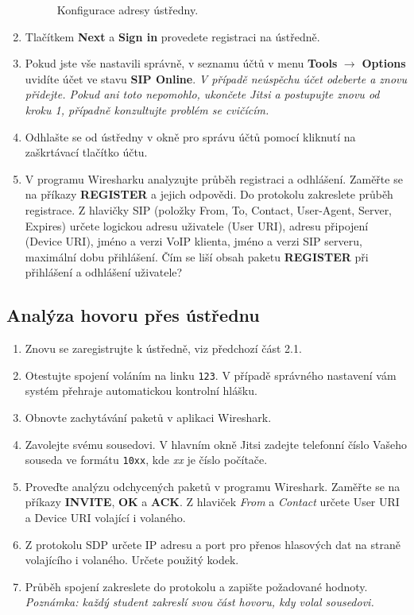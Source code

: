 \begin{enumerate}
\begin{figure}[h!]
        \caption{Konfigurace adresy ústředny.}
        \label{fig:registration2}
      \end{figure}
    \item Tlačítkem {\bf Next} a {\bf Sign in} provedete registraci na ústředně.
    \item  Pokud jste vše nastavili správně, v seznamu účtů v menu {\bf Tools} $\rightarrow$ {\bf Options} uvidíte účet ve stavu {\bf SIP Online}. {\it V případě neúspěchu účet odeberte a znovu přidejte. Pokud ani toto nepomohlo, ukončete Jitsi a postupujte znovu od kroku 1, případně konzultujte problém se cvičícím.}
    \item Odhlašte se od ústředny v okně pro správu účtů pomocí kliknutí na
      zaškrtávací tlačítko účtu.
    \item V programu Wiresharku analyzujte průběh registraci a odhlášení. Zaměřte se na příkazy {\bf REGISTER} a jejich odpovědi. Do protokolu zakreslete průběh registrace. Z hlavičky SIP (položky From, To, Contact, User-Agent, Server, Expires) určete logickou adresu uživatele (User URI), adresu připojení (Device URI), jméno a verzi VoIP klienta, jméno a verzi SIP serveru, maximální dobu přihlášení. Čím se liší obsah paketu {\bf REGISTER} při přihlášení a odhlášení uživatele?
\end{enumerate}

\subsection{Analýza hovoru přes ústřednu}
\begin{enumerate}
  \item Znovu se zaregistrujte k ústředně, viz předchozí část 2.1.
  \item Otestujte spojení voláním na linku {\tt 123}. V případě správného nastavení vám systém přehraje automatickou kontrolní hlášku. 
    \item Obnovte zachytávání paketů v aplikaci Wireshark.
    \item Zavolejte svému sousedovi. V hlavním okně Jitsi zadejte telefonní číslo Vašeho souseda ve formátu {\tt 10xx}, kde {\it xx} je číslo počítače.
    \item Proveďte analýzu odchycených paketů v programu Wireshark. Zaměřte se na příkazy {\bf INVITE}, {\bf OK} a {\bf ACK}. Z hlaviček {\it From} a {\it Contact} určete User URI a Device URI volající i volaného.
    \item Z protokolu SDP určete IP adresu a port pro přenos hlasových dat na straně volajícího i volaného. Určete použitý kodek. 
    \item Průběh spojení zakreslete do protokolu a zapište požadované hodnoty. {\it Poznámka: každý student zakreslí svou část hovoru, kdy volal sousedovi.}
\end{enumerate}

